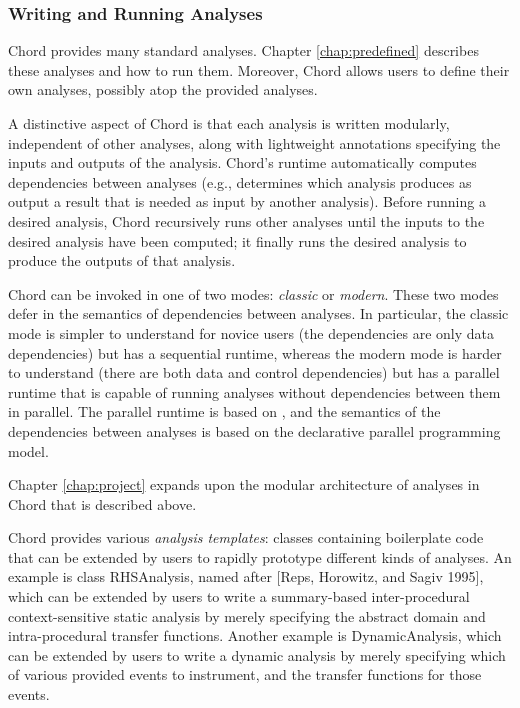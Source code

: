 \subsubsection*{Writing and Running Analyses}

Chord provides many standard analyses.  Chapter \ref{chap:predefined} describes
these analyses and how to run them.  Moreover, Chord allows users to define
their own analyses, possibly atop the provided analyses.

A distinctive aspect of Chord is that each analysis is written modularly,
independent of other analyses, along with lightweight annotations specifying the
inputs and outputs of the analysis.  Chord's runtime automatically computes
dependencies between analyses (e.g., determines which analysis produces as
output a result that is needed as input by another analysis).  Before running a
desired analysis, Chord recursively runs other analyses until the inputs to the
desired analysis have been computed; it finally runs the desired analysis to
produce the outputs of that analysis.

Chord can be invoked in one of two modes: {\it classic} or {\it modern}.  These
two modes defer in the semantics of dependencies between analyses.  In
particular, the classic mode is simpler to understand for novice users (the
dependencies are only data dependencies) but has a sequential runtime, whereas
the modern mode is harder to understand (there are both data and control
dependencies) but has a parallel runtime that is capable of running analyses
without dependencies between them in parallel.  The parallel runtime is based on
, and the semantics of
the dependencies between analyses is based on the
declarative parallel programming model.

Chapter \ref{chap:project} expands upon the modular architecture of analyses in
Chord that is described above.

Chord provides various {\it analysis templates}: classes containing boilerplate
code that can be extended by users to rapidly prototype different kinds of
analyses.  An example is class RHSAnalysis, named after [Reps, Horowitz, and
Sagiv 1995], which can be extended by users to write a summary-based
inter-procedural context-sensitive static analysis by merely specifying the
abstract domain and intra-procedural transfer functions.  Another example is
DynamicAnalysis, which can be extended by users to write a dynamic analysis by
merely specifying which of various provided events to instrument, and the
transfer functions for those events.  

